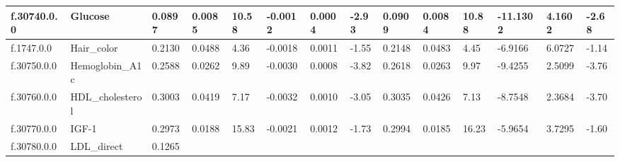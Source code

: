 \begin{longtable}{llllllllllllll}
\multicolumn{1}{|l|}{f.30740.0.0} &
  \multicolumn{1}{l|}{Glucose} &
  \multicolumn{1}{l|}{0.0897} &
  \multicolumn{1}{l|}{0.0085} &
  \multicolumn{1}{l|}{10.58} &
  \multicolumn{1}{l|}{-0.0012} &
  \multicolumn{1}{l|}{0.0004} &
  \multicolumn{1}{l|}{-2.93} &
  \multicolumn{1}{l|}{0.0909} &
  \multicolumn{1}{l|}{0.0084} &
  \multicolumn{1}{l|}{10.88} &
  \multicolumn{1}{l|}{-11.1302} &
  \multicolumn{1}{l|}{4.1602} &
  \multicolumn{1}{l|}{-2.68} \\ \hline
\multicolumn{1}{|l|}{f.1747.0.0} &
  \multicolumn{1}{l|}{Hair\_color} &
  \multicolumn{1}{l|}{0.2130} &
  \multicolumn{1}{l|}{0.0488} &
  \multicolumn{1}{l|}{4.36} &
  \multicolumn{1}{l|}{-0.0018} &
  \multicolumn{1}{l|}{0.0011} &
  \multicolumn{1}{l|}{-1.55} &
  \multicolumn{1}{l|}{0.2148} &
  \multicolumn{1}{l|}{0.0483} &
  \multicolumn{1}{l|}{4.45} &
  \multicolumn{1}{l|}{-6.9166} &
  \multicolumn{1}{l|}{6.0727} &
  \multicolumn{1}{l|}{-1.14} \\ \hline
\multicolumn{1}{|l|}{f.30750.0.0} &
  \multicolumn{1}{l|}{Hemoglobin\_A1c} &
  \multicolumn{1}{l|}{0.2588} &
  \multicolumn{1}{l|}{0.0262} &
  \multicolumn{1}{l|}{9.89} &
  \multicolumn{1}{l|}{-0.0030} &
  \multicolumn{1}{l|}{0.0008} &
  \multicolumn{1}{l|}{-3.82} &
  \multicolumn{1}{l|}{0.2618} &
  \multicolumn{1}{l|}{0.0263} &
  \multicolumn{1}{l|}{9.97} &
  \multicolumn{1}{l|}{-9.4255} &
  \multicolumn{1}{l|}{2.5099} &
  \multicolumn{1}{l|}{-3.76} \\ \hline
\multicolumn{1}{|l|}{f.30760.0.0} &
  \multicolumn{1}{l|}{HDL\_cholesterol} &
  \multicolumn{1}{l|}{0.3003} &
  \multicolumn{1}{l|}{0.0419} &
  \multicolumn{1}{l|}{7.17} &
  \multicolumn{1}{l|}{-0.0032} &
  \multicolumn{1}{l|}{0.0010} &
  \multicolumn{1}{l|}{-3.05} &
  \multicolumn{1}{l|}{0.3035} &
  \multicolumn{1}{l|}{0.0426} &
  \multicolumn{1}{l|}{7.13} &
  \multicolumn{1}{l|}{-8.7548} &
  \multicolumn{1}{l|}{2.3684} &
  \multicolumn{1}{l|}{-3.70} \\ \hline
\multicolumn{1}{|l|}{f.30770.0.0} &
  \multicolumn{1}{l|}{IGF-1} &
  \multicolumn{1}{l|}{0.2973} &
  \multicolumn{1}{l|}{0.0188} &
  \multicolumn{1}{l|}{15.83} &
  \multicolumn{1}{l|}{-0.0021} &
  \multicolumn{1}{l|}{0.0012} &
  \multicolumn{1}{l|}{-1.73} &
  \multicolumn{1}{l|}{0.2994} &
  \multicolumn{1}{l|}{0.0185} &
  \multicolumn{1}{l|}{16.23} &
  \multicolumn{1}{l|}{-5.9654} &
  \multicolumn{1}{l|}{3.7295} &
  \multicolumn{1}{l|}{-1.60} \\ \hline
\multicolumn{1}{|l|}{f.30780.0.0} &
  \multicolumn{1}{l|}{LDL\_direct} &
  \multicolumn{1}{l|}{0.1265} &

\end{longtable}
